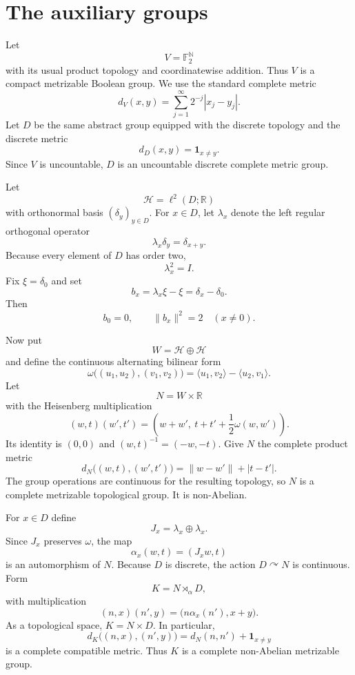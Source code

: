 \documentclass[11pt]{article}
\theoremstyle{remark}
\newcommand{\Ftwo}{\mathbb F_2}
\newcommand{\R}{\mathbb R}
\newcommand{\cH}{\mathcal H}
\begin{document}
\section{The auxiliary groups}

Let
\[
V=\Ftwo^{\mathbb N}
\]
with its usual product topology and coordinatewise addition. Thus $V$ is a compact metrizable Boolean group. We use the standard complete metric
\[
d_V(x,y)=\sum_{j=1}^{\infty}2^{-j}|x_j-y_j|.
\]
Let $D$ be the same abstract group equipped with the discrete topology and the discrete metric
\[
d_D(x,y)=\mathbf 1_{x\ne y}.
\]
Since $V$ is uncountable, $D$ is an uncountable discrete complete metric group.

Let
\[
\cH=\ell^2(D;\R)
\]
with orthonormal basis $(\delta_y)_{y\in D}$. For $x\in D$, let $\lambda_x$ denote the left regular orthogonal operator
\[
\lambda_x\delta_y=\delta_{x+y}.
\]
Because every element of $D$ has order two,
\[
\lambda_x^2=I.
\]
Fix $\xi=\delta_0$ and set
\[
b_x=\lambda_x\xi-\xi=\delta_x-\delta_0.
\]
Then
\begin{equation}\label{eq:bnorm}
b_0=0,
\qquad
\|b_x\|^2=2\quad(x\ne0).
\end{equation}

Now put
\[
W=\cH\oplus\cH
\]
and define the continuous alternating bilinear form
\[
\omega\bigl((u_1,u_2),(v_1,v_2)\bigr)
=
\langle u_1,v_2\rangle-\langle u_2,v_1\rangle.
\]
Let
\[
N=W\times\R
\]
with the Heisenberg multiplication
\begin{equation}\label{eq:heis}
(w,t)(w',t')
=
\left(w+w',\ t+t'+\frac12\omega(w,w')\right).
\end{equation}
Its identity is $(0,0)$ and $(w,t)^{-1}=(-w,-t)$. Give $N$ the complete product metric
\[
d_N\bigl((w,t),(w',t')\bigr)=\|w-w'\|+|t-t'|.
\]
The group operations are continuous for the resulting topology, so $N$ is a complete metrizable topological group. It is non-Abelian.

For $x\in D$ define
\[
J_x=\lambda_x\oplus\lambda_x.
\]
Since $J_x$ preserves $\omega$, the map
\[
\alpha_x(w,t)=(J_xw,t)
\]
is an automorphism of $N$. Because $D$ is discrete, the action $D\curvearrowright N$ is continuous. Form
\[
K=N\rtimes_{\alpha}D,
\]
with multiplication
\begin{equation}\label{eq:semi}
(n,x)(n',y)=\bigl(n\alpha_x(n'),x+y\bigr).
\end{equation}
As a topological space, $K=N\times D$. In particular,
\[
d_K\bigl((n,x),(n',y)\bigr)=d_N(n,n')+\mathbf 1_{x\ne y}
\]
is a complete compatible metric. Thus $K$ is a complete non-Abelian metrizable group.
\end{document}
